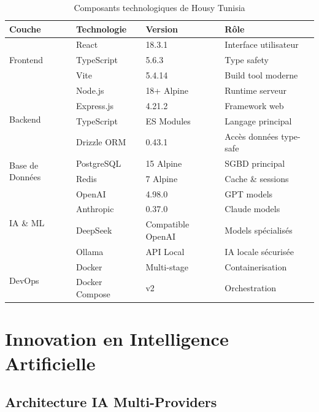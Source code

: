 \begin{table}[H]
\centering
\caption{Composants technologiques de Housy Tunisia}
\begin{tabular}{|l|l|l|l|}
\hline
\textbf{Couche} & \textbf{Technologie} & \textbf{Version} & \textbf{Rôle} \\
\hline
\multirow{3}{*}{Frontend} & React & 18.3.1 & Interface utilisateur \\
& TypeScript & 5.6.3 & Type safety \\
& Vite & 5.4.14 & Build tool moderne \\
\hline
\multirow{4}{*}{Backend} & Node.js & 18+ Alpine & Runtime serveur \\
& Express.js & 4.21.2 & Framework web \\
& TypeScript & ES Modules & Langage principal \\
& Drizzle ORM & 0.43.1 & Accès données type-safe \\
\hline
\multirow{2}{*}{Base de Données} & PostgreSQL & 15 Alpine & SGBD principal \\
& Redis & 7 Alpine & Cache \& sessions \\
\hline
\multirow{4}{*}{IA \& ML} & OpenAI & 4.98.0 & GPT models \\
& Anthropic & 0.37.0 & Claude models \\
& DeepSeek & Compatible OpenAI & Models spécialisés \\
& Ollama & API Local & IA locale sécurisée \\
\hline
\multirow{2}{*}{DevOps} & Docker & Multi-stage & Containerisation \\
& Docker Compose & v2 & Orchestration \\
\hline
\end{tabular}
\label{tab:stack_technique}
\end{table}


\section{Innovation en Intelligence Artificielle}

\subsection{Architecture IA Multi-Providers}


